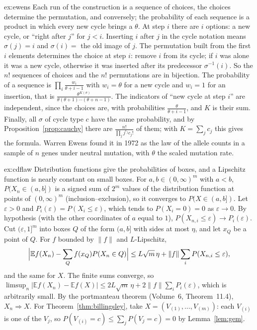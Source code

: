 \begin{solution}{ex:ewens}
\idea Each run of the construction is a sequence of choices, the choices determine the permutation, and conversely; the probability of each sequence is a product in which every new cycle brings a $\theta$.
\writeup At step $i$ there are $i$ options: a new cycle, or ``right after $j$'' for $j<i$. Inserting $i$ after $j$ in the cycle notation means $\sigma(j)=i$ and $\sigma(i)=$ the old image of $j$. The permutation built from the first $i$ elements determines the choice at step $i$: remove
$i$ from its cycle; if $i$ was alone it was a new cycle, otherwise it was inserted after its predecessor $\sigma^{-1}(i)$. So the $n!$ sequences of choices and the $n!$ permutations are in bijection. The probability of a sequence is $\prod_i\frac{w_i}{\theta+i-1}$ with $w_i=\theta$ for a new
cycle and $w_i=1$ for an insertion, that is $\frac{\theta^{K(\sigma)}}{\theta(\theta+1)\cdots(\theta+n-1)}$. The indicators of ``new cycle at step $i$'' are independent, since the choices are, with probabilities $\frac\theta{\theta+i-1}$, and $K$ is their sum. Finally, all $\sigma$ of cycle type $c$ have the
same probability, and by Proposition~\ref{prop:cauchy} there are $\frac{n!}{\prod_jj^{c_j}c_j!}$ of them; with $K=\sum_jc_j$ this gives the formula. Warren Ewens found it in 1972 as the law of the allele counts in a sample of $n$ genes under neutral mutation, with $\theta$ the scaled mutation rate.
\end{solution}

\begin{solution}{ex:cdflaw}
\idea Distribution functions give the probabilities of boxes, and a Lipschitz function is nearly constant on small boxes.
\writeup For $a,b\in(0,\infty)^m$ with $a<b$, $P(X_n\in(a,b])$ is a signed sum of $2^m$ values of the distribution function at points of $(0,\infty)^m$ (inclusion--exclusion), so it converges to $P(X\in(a,b])$. Let $\varepsilon>0$ and
$P_i(\varepsilon)=P(X_i\le\varepsilon)$, which tends to $P(X_i=0)=0$ as $\varepsilon\to0$. By hypothesis (with the other coordinates of $a$ equal to $1$), $P(X_{n,i}\le\varepsilon)\to P_i(\varepsilon)$. Cut $(\varepsilon,1]^m$ into boxes $Q$ of the form $(a,b]$ with sides at most $\eta$, and let $x_Q$ be a point of $Q$. For $f$
bounded by $\|f\|$ and $L$-Lipschitz,
\[
\Bigl|\mathbb Ef(X_n)-\sum_Qf(x_Q)P(X_n\in Q)\Bigr|\le L\sqrt m\,\eta+\|f\|\sum_iP(X_{n,i}\le\varepsilon),
\]
and the same for $X$. The finite sums converge, so $\limsup_n|\mathbb Ef(X_n)-\mathbb Ef(X)|\le2L\sqrt m\,\eta+2\|f\|\sum_iP_i(\varepsilon)$, which is arbitrarily small. By the portmanteau theorem (Volume~6, Theorem~11.4), $X_n\Rightarrow X$. For Theorem~\ref{thm:billingsley}, take
$X=(V_{(1)},\dots,V_{(m)})$: each $V_{(i)}$ is one of the $V_j$, so $P(V_{(i)}=c)\le\sum_jP(V_j=c)=0$ by Lemma~\ref{lem:gem}.
\end{solution}

